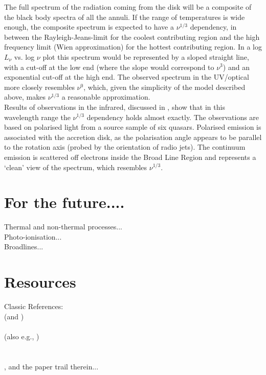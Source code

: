 \documentclass[11pt]{article}
\begin{document}
\noindent
The full spectrum of the radiation coming from the disk will be a composite of the black body spectra of all the annuli. If the range of temperatures is wide enough, the composite spectrum is expected to have a $\nu^{1/3}$ dependency, in between the Rayleigh-Jeans-limit for the coolest contributing region and the high frequency limit (Wien approximation) for the hottest contributing region. In a log$L_{\nu}$ vs. log $\nu$ plot this spectrum would be represented by a sloped straight line, with a cut-off at the low end (where the slope would correspond to $\nu^3$) and an exponential cut-off at the high end. The observed spectrum in the UV/optical more closely resembles $\nu^0$, which, given the simplicity of the model described above, makes $\nu^{1/3}$ a reasonable approximation.\\
\indent Results of observations in the infrared, discussed in \citet{Kishimoto08}, show that in this wavelength range the $\nu^{1/3}$ dependency holds almost exactly. The observations are based on polarised light from a source sample of six quasars. Polarised emission is associated with the accretion disk, as the polarisation angle appears to be parallel to the rotation axis (probed by the orientation of radio jets). The continuum emission is scattered off electrons inside the Broad Line Region and represents a `clean' view of the spectrum, which resembles $\nu^{1/3}$.\\





\clearpage
\section{For the future....}
Thermal and non-thermal processes...\\
Photo-ionisation...\\
Broadlines...\\



\clearpage
\section{Resources}
Classic References:\\
\citet{SS73} (and \citet{King09}) \\
\citet{Pringle81}\\
(also e.g., \citet{Pringle72, Pringle73, Pringle96})\\
\citet{Richards06b}\\
\citet{Kishimoto08}\\
\citet{Lawrence12}, and the paper trail therein...\\
\end{document}
